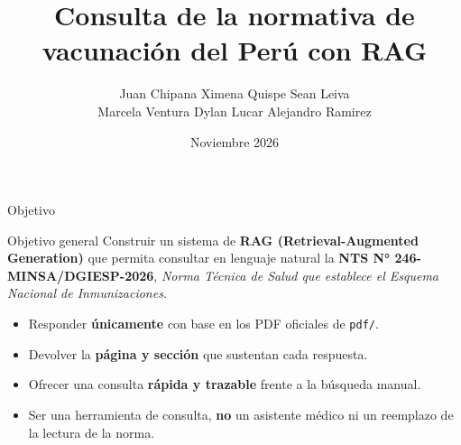 \documentclass[aspectratio=169,11pt]{beamer}
\title[NTS 246]{Consulta de la normativa de vacunación del Perú con RAG}
\author[Grupo 6]{%
  \begin{tabular}{c}
    Juan Chipana \quad Ximena Quispe \quad Sean Leiva \\[3pt]
    Marcela Ventura \quad Dylan Lucar \quad Alejandro Ramirez
  \end{tabular}}
\date{Noviembre 2026}
\begin{document}
\begin{frame}
  \titlepage
\end{frame}

\begin{frame}{Objetivo}
  \begin{block}{Objetivo general}
    Construir un sistema de \textbf{RAG (Retrieval-Augmented Generation)} que permita
    consultar en lenguaje natural la \textbf{NTS N° 246-MINSA/DGIESP-2026},
    \emph{Norma Técnica de Salud que establece el Esquema Nacional de Inmunizaciones}.
  \end{block}

  \vspace{2mm}
  \begin{itemize}
    \item Responder \textbf{únicamente} con base en los PDF oficiales de \texttt{pdf/}.
    \item Devolver la \textbf{página y sección} que sustentan cada respuesta.
    \item Ofrecer una consulta \textbf{rápida y trazable} frente a la búsqueda manual.
    \item Ser una herramienta de consulta, \textbf{no} un asistente médico ni un reemplazo
          de la lectura de la norma.
  \end{itemize}
\end{frame}
\end{document}

